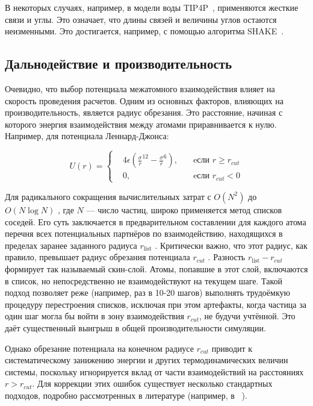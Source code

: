 В некоторых случаях, например, в модели воды TIP4P~\cite{abascal_general_2005}, применяются жесткие связи и углы. Это означает, что длины связей и величины углов остаются неизменными. Это достигается, например, с помощью алгоритма SHAKE~\cite{ryckaert_numerical_1977}. 

\subsection{Дальнодействие и производительность}

Очевидно, что выбор потенциала межатомного взаимодействия влияет на скорость проведения расчетов. Одним из основных факторов, влияющих на производительность, является радиус обрезания. Это расстояние, начиная с которого энергия взаимодействия между атомами приравнивается к нулю. Например, для потенциала Леннард-Джонса:

\[
U(r) = \left\{
\begin{alignedat}{2}
    &4 \epsilon (\frac{\sigma}{r}^{12}-\frac{\sigma}{r}^6), \quad &\text{eсли } r\geqslant r_{cut} \\
    &0, \quad & \text{eсли } r_{cut}<0
\end{alignedat}
\right.
\]

Для радикального сокращения вычислительных затрат с  $O(N^2)$  до  $O(N \log N)$ , где  $N$  — число частиц, широко применяется метод списков соседей. Его суть заключается в предварительном составлении для каждого атома перечня всех потенциальных партнёров по взаимодействию, находящихся в пределах заранее заданного радиуса  $r_{\text{list}}$ . Критически важно, что этот радиус, как правило, превышает радиус обрезания потенциала  $r_{cut}$ . Разность  $r_{\text{list}} - r_{cut}$  формирует так называемый скин-слой. Атомы, попавшие в этот слой, включаются в список, но непосредственно не взаимодействуют на текущем шаге. Такой подход позволяет реже (например, раз в 10-20 шагов) выполнять трудоёмкую процедуру перестроения списков, исключая при этом артефакты, когда частица за один шаг могла бы войти в зону взаимодействия  $r_{cut}$, не будучи учтённой. Это даёт существенный выигрыш в общей производительности симуляции.

Однако обрезание потенциала на конечном радиусе $r_{cut}$ приводит к систематическому занижению энергии и других термодинамических величин системы, поскольку игнорируется вклад от части взаимодействий на расстояниях  $r > r_{cut}$. Для коррекции этих ошибок существует несколько стандартных подходов, подробно рассмотренных в литературе (например, в ~\cite{sun_compass_1998}).

